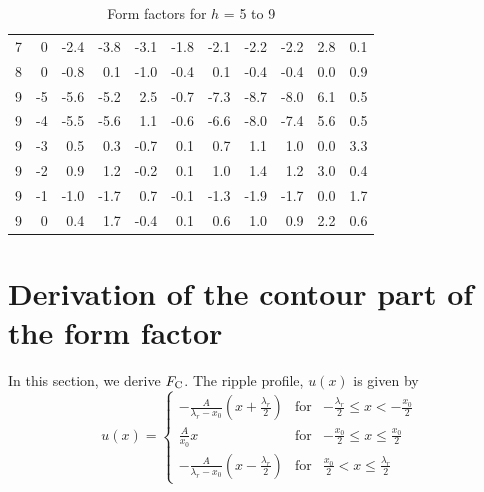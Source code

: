 \begin{table}[htbp]
\begin{tabular}{rrrrrrrrrrr}
7 & 0 & -2.4 & -3.8 & -3.1 & -1.8 & -2.1 & -2.2 & -2.2 & 2.8 & 0.1 \\ 
8 & 0 & -0.8 & 0.1 & -1.0 & -0.4 & 0.1 & -0.4 & -0.4 & 0.0 & 0.9 \\ 
9 & -5 & -5.6 & -5.2 & 2.5 & -0.7 & -7.3 & -8.7 & -8.0 & 6.1 & 0.5 \\ 
9 & -4 & -5.5 & -5.6 & 1.1 & -0.6 & -6.6 & -8.0 & -7.4 & 5.6 & 0.5 \\ 
9 & -3 & 0.5 & 0.3 & -0.7 & 0.1 & 0.7 & 1.1 & 1.0 & 0.0 & 3.3 \\ 
9 & -2 & 0.9 & 1.2 & -0.2 & 0.1 & 1.0 & 1.4 & 1.2 & 3.0 & 0.4 \\ 
9 & -1 & -1.0 & -1.7 & 0.7 & -0.1 & -1.3 & -1.9 & -1.7 & 0.0 & 1.7 \\ 
9 & 0 & 0.4 & 1.7 & -0.4 & 0.1 & 0.6 & 1.0 & 0.9 & 2.2 & 0.6 \\ 
\hline
\end{tabular}
\caption{Form factors for $h$ = 5 to 9}
\label{tb:LAXS_fits2}
\end{table}

\newpage
\section{Derivation of the contour part of the form factor}
In this section, we derive $F_\mathrm{C}$. The ripple profile, $u(x)$ is given by
\begin{equation}
  u(x) = \left\{
    \begin{array}{ccc}
    -\frac{A}{\lambda_r-x_0}\left(x+\frac{\lambda_r}{2}\right) 
      & \text{for} 
      & -\frac{\lambda_r}{2} \leq x < -\frac{x_0}{2} \\
    \frac{A}{x_0}x 
      & \text{for} 
      & -\frac{x_0}{2} \leq x \leq \frac{x_0}{2} \\
    -\frac{A}{\lambda_r-x_0} \left(x-\frac{\lambda_r}{2}\right)
      & \text{for} 
      & \frac{x_0}{2} < x \leq \frac{\lambda_r}{2}
    \end{array} \right.
\end{equation}

